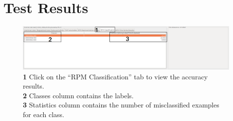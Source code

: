 \documentclass[letterpaper, 12pt]{article}
\begin{document}
\section{Test Results}
\vspace{-.6em}
\begin{figure}[H]
	\includegraphics[width=\textwidth]{quickstartpics/testresults}
	\textbf{1} Click on the ``RPM Classification'' tab to view the accuracy results.\\ \textbf{2} Classes column contains the labels.\\ \textbf{3} Statistics column contains the number of misclassified examples for each class.
	\label{fig:testresults}
\end{figure}
\end{document}
